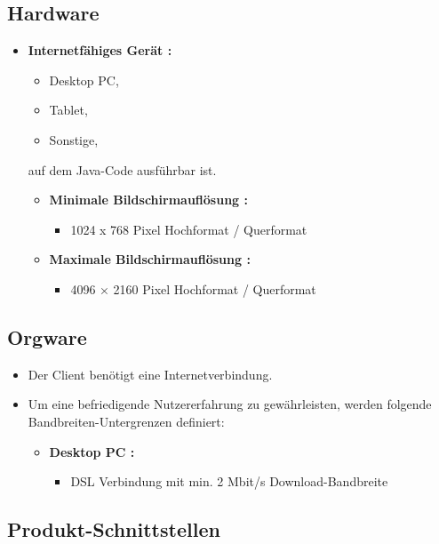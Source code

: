 	\subsection{Hardware}
	\begin{itemize}
		\item \textbf{Internetfähiges Gerät :}
		\begin{itemize}
			\item Desktop PC,  
			\item Tablet,
			\item Sonstige,
		\end{itemize}
		auf dem Java-Code ausführbar ist. 
		\begin{itemize}
			\item \textbf{Minimale Bildschirmauflösung :}
			\begin{itemize}
				\item 1024 x 768 Pixel Hochformat / Querformat
			\end{itemize}
			\item \textbf{Maximale Bildschirmauflösung :}
			\begin{itemize}
				\item 4096 × 2160 Pixel Hochformat / Querformat
			\end{itemize}
				
		\end{itemize}
		
		
	
	\end{itemize}
	\subsection{Orgware}
	\begin{itemize}
		\item Der Client benötigt eine Internetverbindung.
		\item Um eine befriedigende Nutzererfahrung zu gewährleisten, werden folgende Bandbreiten-Untergrenzen definiert:
		\begin{itemize}
			\item \textbf{ Desktop PC :}
			\begin{itemize}
				\item DSL Verbindung mit min. 2 Mbit/s Download-Bandbreite
			\end{itemize}
		\end{itemize}
	\end{itemize}
	\subsection{Produkt-Schnittstellen}
	
